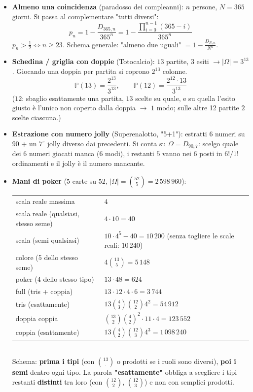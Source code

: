 \documentclass[12pt]{extarticle} %
\begin{document}
\begin{itemize}
    \item \textbf{Almeno una coincidenza} (paradosso dei compleanni): $n$ persone, $N = 365$ giorni. Si passa al complementare "tutti diversi":
    $$ p_n = 1 - \frac{D_{365,n}}{365^n} = 1 - \frac{\prod_{i=0}^{n-1}(365-i)}{365^n} $$
    {\footnotesize $p_n > \frac{1}{2} \iff n \ge 23$. Schema generale: "almeno due uguali" $= 1 - \frac{D_{N,n}}{N^n}$.}

    \item \textbf{Schedina / griglia con doppie} (Totocalcio): $13$ partite, $3$ esiti $\to |\Omega| = 3^{13}$. Giocando una doppia per partita si coprono $2^{13}$ colonne.
    $$ \mathbb{P}(13) = \frac{2^{13}}{3^{13}}, \qquad \mathbb{P}(12) = \frac{2^{12} \cdot 13}{3^{13}} $$
    {\footnotesize ($12$: sbaglio esattamente una partita, $13$ scelte su quale, e su quella l'esito giusto è l'unico non coperto dalla doppia $\to$ $1$ modo; sulle altre 12 partite $2$ scelte ciascuna.)}

    \item \textbf{Estrazione con numero jolly} (Superenalotto, "5+1"): estratti $6$ numeri su $90$ + un $7^\circ$ jolly diverso dai precedenti. Si conta su $\Omega = D_{90,7}$: scelgo quale dei $6$ numeri giocati manca ($6$ modi), i restanti $5$ vanno nei $6$ posti in $6!/1!$ ordinamenti e il jolly è il numero mancante.

    \item \textbf{Mani di poker} (5 carte su 52, $|\Omega| = \binom{52}{5} = 2\,598\,960$): \\
    \begin{tabular}{@{}ll@{}}
    scala reale massima & $4$ \\
    scala reale (qualsiasi, stesso seme) & $4 \cdot 10 = 40$ \\
    scala (semi qualsiasi) & $10 \cdot 4^5 - 40 = 10\,200$ \; {\footnotesize (senza togliere le scale reali: $10\,240$)} \\
    colore (5 dello stesso seme) & $4\binom{13}{5} = 5\,148$ \\
    poker (4 dello stesso tipo) & $13 \cdot 48 = 624$ \\
    full (tris + coppia) & $13 \cdot 12 \cdot 4 \cdot 6 = 3\,744$ \\
    tris (esattamente) & $13\binom{4}{3}\binom{12}{2}4^2 = 54\,912$ \\
    doppia coppia & $\binom{13}{2}\binom{4}{2}^2 \cdot 11 \cdot 4 = 123\,552$ \\
    coppia (esattamente) & $13\binom{4}{2}\binom{12}{3}4^3 = 1\,098\,240$ \\
    \end{tabular} \\
    {\footnotesize Schema: \textbf{prima i tipi} (con $\binom{13}{\cdot}$ o prodotti se i ruoli sono diversi), \textbf{poi i semi} dentro ogni tipo. La parola \textbf{"esattamente"} obbliga a scegliere i tipi restanti \textbf{distinti} tra loro (con $\binom{12}{2}$, $\binom{12}{3}$) e non con semplici prodotti.}
\end{itemize}
\end{document}
